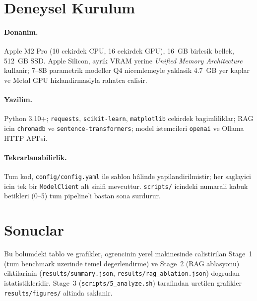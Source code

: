 \documentclass[11pt,a4paper]{article}
\begin{document}
\section{Deneysel Kurulum}
\label{sec:kurulum}
\paragraph{Donanim.} Apple M2 Pro (10 cekirdek CPU, 16 cekirdek GPU), 16~GB
birlesik bellek, 512~GB SSD. Apple Silicon, ayrik VRAM yerine \emph{Unified
Memory Architecture} kullanir; 7--8B parametrik modeller Q4 nicemlemeyle
yaklasik 4.7~GB yer kaplar ve Metal GPU hizlandirmasiyla rahatca calisir.
\paragraph{Yazilim.} Python 3.10+; \texttt{requests}, \texttt{scikit-learn},
\texttt{matplotlib} cekirdek bagimliliklar; RAG icin \texttt{chromadb} ve
\texttt{sentence-transformers}; model istemcileri \texttt{openai} ve Ollama
HTTP API'si.
\paragraph{Tekrarlanabilirlik.} Tum kod, \texttt{config/config.yaml} ile
sablon hâlinde yapilandirilmistir; her saglayici icin tek bir
\texttt{ModelClient} alt sinifi mevcuttur. \texttt{scripts/} icindeki
numarali kabuk betikleri (0--5) tum pipeline'i bastan sona surdurur.

\section{Sonuclar}
\label{sec:sonuc}

Bu bolumdeki tablo ve grafikler, ogrencinin yerel makinesinde calistirilan
Stage~1 (tum benchmark uzerinde temel degerlendirme) ve Stage~2 (RAG ablasyonu)
ciktilarinin (\texttt{results/summary.json}, \texttt{results/rag\_ablation.json})
dogrudan istatistikleridir. Stage~3 (\texttt{scripts/5\_analyze.sh}) tarafindan
uretilen grafikler \texttt{results/figures/} altinda saklanir.
\end{document}
